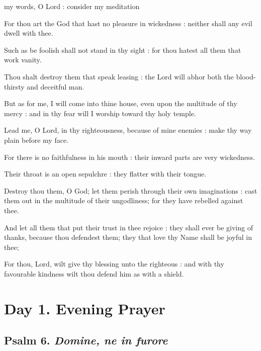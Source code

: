  my words, O Lord : consider my meditation\par
{}
For thou art the God that hast no pleasure in wickedness : neither shall any evil dwell with thee.\par
{}Such as be foolish shall not stand in thy sight : for thou hatest all them that work vanity.\par
{}Thou shalt destroy them that speak leasing : the Lord will abhor both the blood-thirsty and deceitful man.\par
{}But as for me, I will come into thine house, even upon the multitude of thy mercy : and in thy fear will I worship toward thy holy temple.\par
{}Lead me, O Lord, in thy righteousness, because of mine enemies : make thy way plain before my face.\par
{}For there is no faithfulness in his mouth : their inward parts are very wickedness.\par
{}Their throat is an open sepulchre : they flatter with their tongue.\par
{}Destroy thou them, O God; let them perish through their own imaginations : cast them out in the multitude of their ungodliness; for they have rebelled against thee.\par
{}And let all them that put their trust in thee rejoice : they shall ever be giving of thanks, because thou defendest them; they that love thy Name shall be joyful in thee;\par
{}For thou, Lord, wilt give thy blessing unto the righteous : and with thy favourable kindness wilt thou defend him as with a shield.\par

\section*{Day 1. Evening Prayer}

\subsection{Psalm 6. \textit{Domine, ne in furore}}

